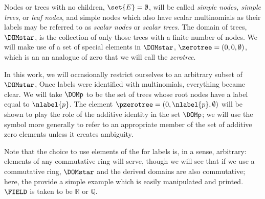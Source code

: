 Nodes or trees with no children, \(\set{E} = \emptyset\), will be
called \emph{simple nodes, simple trees}, or \emph{leaf nodes}, and
simple nodes which also have scalar multinomials as their labels may
be referred to as \emph{scalar nodes} or \emph{scalar trees}. The
domain of trees, $\DOMstar$, is the collection of only those trees
with a finite number of nodes.  We will make use of a set of special
elements in $\DOMstar$, $\zerotree = (0, 0, \emptyset)$, which is an
an analogue of zero that we will call the \emph{zerotree}.

In this work, we will occasionally restrict ourselves to an arbitrary
subset of $\DOMstar$, Once labels were identified with multinomials,
everything became clear. We will take $\DOMp$ to be the set of trees
whose root nodes have a label equal to $\nlabel{p}$. The element
$\pzerotree = (0, \nlabel{p}, \emptyset)$ will be shown to play the
role of the additive identity in the set $\DOMp$; we will use the
symbol \tzerotree  more generally to refer to an appropriate member of
the set of additive zero elements unless it creates ambiguity.



Note that the choice to use elements of the \polytypes for labels is, in a
sense, arbitrary: elements of any commutative ring will serve, though
we will see that if we use a commutative ring, $\DOMstar$ and the derived
domains are also commutative; here, the \polytypes provide a
simple example which is easily manipulated and printed. 
$\FIELD$ is taken to be $\mathbb{R}$ or $\mathbb{Q}$.

